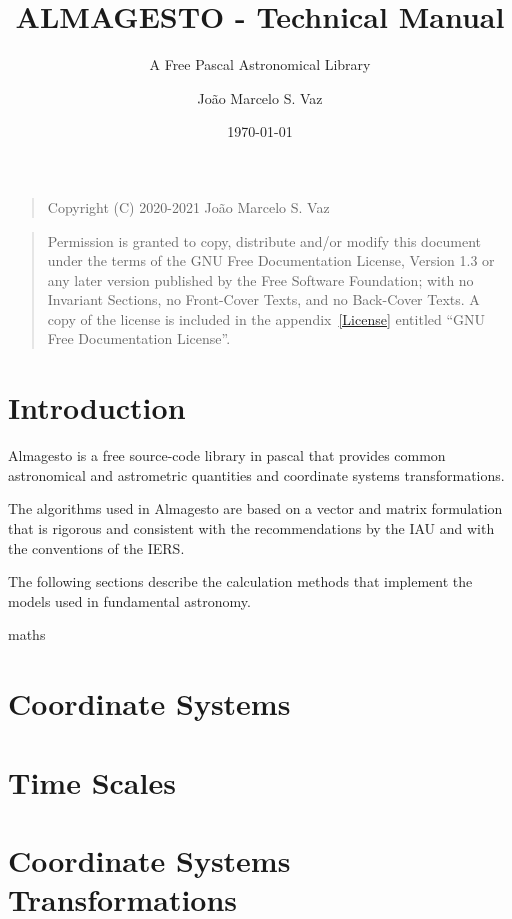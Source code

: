\documentclass[a4paper,11pt]{scrreport}
\title{ALMAGESTO - Technical Manual}
\subtitle{A Free Pascal Astronomical Library}
\author{João Marcelo S. Vaz}
\date{\today}
\begin{document}
	
\maketitle
{}
\begin{quote}    
Copyright (C) 2020-2021 João Marcelo S. Vaz
\end{quote}
\begin{quote} 
Permission is granted to copy, distribute and/or modify this document under the terms of the GNU Free Documentation License, Version 1.3 or any later version published by the Free Software Foundation; with no Invariant Sections, no Front-Cover Texts, and no Back-Cover Texts. A copy of the license is included in the appendix~\ref{License} entitled ``GNU Free Documentation License''.
\end{quote}
	
\tableofcontents
\printglossary[type=\acronymtype,title=List of Abbreviations]

	
\clearpage
{}
\chapter{Introduction}\label{Introduction}

Almagesto is a free source-code library in pascal that provides common astronomical and astrometric quantities and coordinate systems transformations.

The algorithms used in Almagesto are based on a vector and matrix formulation that is rigorous and consistent with the recommendations by the \gls{IAU} and with the conventions of the \gls{IERS}.

The following sections describe the calculation methods that implement the models used in fundamental astronomy.

\gls{maths}

\chapter{Coordinate Systems}\label{CoordinateSystems}
\chapter{Time Scales}\label{TimeScales}
\chapter{Coordinate Systems Transformations}\label{CoordinateSystemsTransformations}
\end{document}
